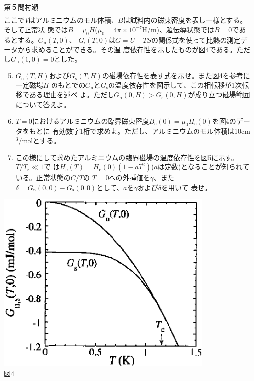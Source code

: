 \begin{question}{第５問}{村瀬}
\begin{align}
\end{align}
ここで$V$はアルミニウムのモル体積、$B$は試料内の磁束密度を表し一様とする。そして正常状
態では$B=\mu_0H$($\mu_0=4\pi\times10^{-7}$H/m)、超伝導状態では$B=0$であるとする。$G_\mathrm{n}(T,0)$、
$G_\mathrm{s}(T,0)$は$G=U-TS$の関係式を使って比熱の測定データから求めることができる。その温
度依存性を示したものが図4である。ただし$G_\mathrm{n}(0,0)=0$とした。
\begin{enumerate}
\setcounter{enumi}{4}
\item
  $G_\mathrm{n}(T,H)$および$G_\mathrm{s}(T,H)$の磁場依存性を表す式を示せ。また図4を参考に一定磁場$H$
  のもとでの$G_\mathrm{n}$と$G_\mathrm{s}$の温度依存性を図示して、この相転移が1次転移である理由を述べ
  よ。ただし$G_\mathrm{n}(0,H)>G_\mathrm{s}(0,H)$が成り立つ磁場範囲について答えよ。
\item
  $T=0$におけるアルミニウムの臨界磁束密度$B_\mathrm{c}(0)=\mu_0H_\mathrm{c}(0)$を図4のデータをもとに
  有効数字1桁で求めよ。ただし、アルミニウムのモル体積は10cm$^3$/molとする。
\item
  この様にして求めたアルミニウムの臨界磁場の温度依存性を図5に示す。$T/T_\mathrm{c}\ll1$で
  は$H_\mathrm{c}(T)=H_\mathrm{c}(0)(1-aT^2)$($a$は定数)となることが知られている。正常状態の$C/T$の
  $T=0$への外挿値を$\gamma$、また$\delta=G_\mathrm{n}(0,0)-G_\mathrm{s}(0,0)$として、$a$を$\gamma$および$\delta$を用いて
  表せ。
\end{enumerate}
\begin{center}
  \begin{minipage}[t]{0.55\textwidth}
    \begin{center}
      \includegraphics[width=0.8\textwidth]{2006physQ5_4r.eps}\\図4

\end{center}
\end{minipage}
\end{center}
\end{question}
